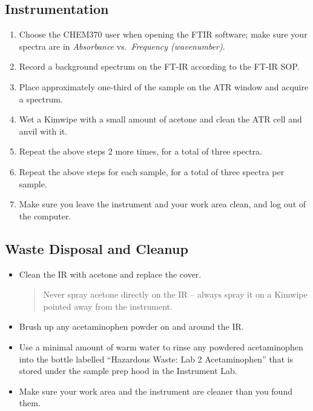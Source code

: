 \documentclass[]{tufte-book}
\providecommand{\tightlist}{%
  \setlength{\itemsep}{0pt}\setlength{\parskip}{0pt}}
\begin{document}
\hypertarget{instrumentation}{%
\subsection{Instrumentation}\label{instrumentation}}

\begin{enumerate}
\def\labelenumi{\arabic{enumi}.}
\tightlist
\item
  Choose the CHEM370 user when opening the FTIR software; make sure your spectra are in \emph{Absorbance} vs.~\emph{Frequency (wavenumber)}.
\item
  Record a background spectrum on the FT-IR according to the FT-IR SOP.
\item
  Place approximately one-third of the sample on the ATR window and acquire a spectrum.
\item
  Wet a Kimwipe with a small amount of acetone and clean the ATR cell and anvil with it.
\item
  Repeat the above steps 2 more times, for a total of three spectra.
\item
  Repeat the above steps for each sample, for a total of three spectra per sample.
\item
  Make sure you leave the instrument and your work area clean, and log out of the computer.
\end{enumerate}

\hypertarget{waste-disposal-and-cleanup-1}{%
\subsection{Waste Disposal and Cleanup}\label{waste-disposal-and-cleanup-1}}

\begin{itemize}
\item
  Clean the IR with acetone and replace the cover.

  \begin{quote}
  Never spray acetone directly on the IR -- always spray it on a Kimwipe pointed away from the instrument.
  \end{quote}
\item
  Brush up any acetaminophen powder on and around the IR.
\item
  Use a minimal amount of warm water to rinse any powdered acetaminophen into the bottle labelled ``Hazardous Waste: Lab 2 Acetaminophen'' that is stored under the sample prep hood in the Instrument Lab.
\item
  Make sure your work area and the instrument are cleaner than you found them.
\end{itemize}
\end{document}
